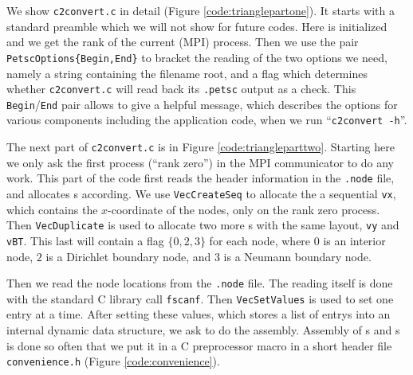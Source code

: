 We show \texttt{c2convert.c} in detail (Figure \ref{code:trianglepartone}).  It starts with a standard preamble which we will not show for future codes.  Here \PETSc is initialized and we get the rank of the current (MPI) process.  Then we use the pair \texttt{PetscOptions\{Begin,End\}} to bracket the reading of the two options we need, namely a string containing the filename root, and a flag which determines whether \texttt{c2convert.c} will read back its \texttt{.petsc} output as a check.  This \texttt{Begin}/\texttt{End} pair allows \PETSc to give a helpful message, which describes the options for various components including the application code, when we run ``\texttt{c2convert -h}''.


The next part of \texttt{c2convert.c} is in Figure \ref{code:triangleparttwo}.  Starting here we only ask the first process (``rank zero'') in the MPI communicator to do any work.  This part of the code first reads the header information in the \texttt{.node} file, and allocates \PETSc \pVec s according.  We use \texttt{VecCreateSeq} to allocate the a sequential \pVec \texttt{vx}, which contains the $x$-coordinate of the nodes, only on the rank zero process.  Then \texttt{VecDuplicate} is used to allocate two more \pVec s with the same layout, \texttt{vy} and \texttt{vBT}.  This last \pVec will contain a flag $\{0,2,3\}$ for each node, where $0$ is an interior node, $2$ is a Dirichlet boundary node, and $3$ is a Neumann boundary node.


Then we read the node locations from the \texttt{.node} file.  The reading itself is done with the standard C library call \texttt{fscanf}.  Then \texttt{VecSetValues} is used to set one entry at a time.  After setting these values, which stores a list of entrys into an internal \PETSc dynamic data structure, we ask \PETSc to do the assembly.  Assembly of \pVec s and \pMat s is done so often that we put it in a C preprocessor macro in a short header file \texttt{convenience.h} (Figure \ref{code:convenience}).

